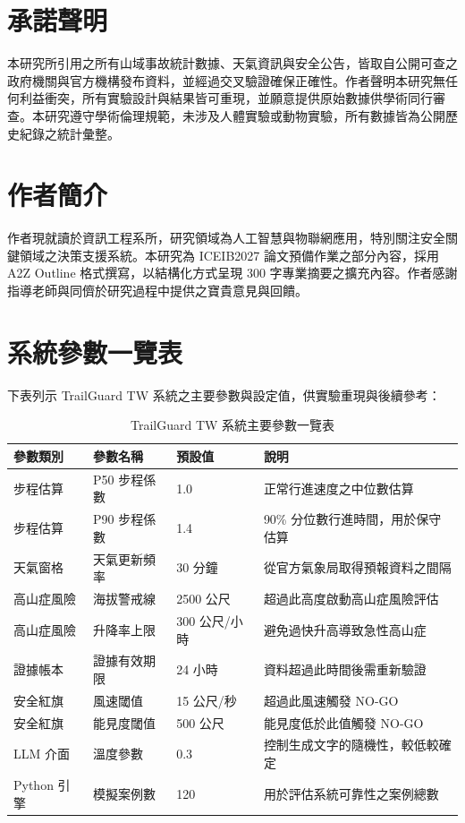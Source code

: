 \documentclass[12pt,a4paper]{article}
\begin{document}
\section{承諾聲明}
本研究所引用之所有山域事故統計數據、天氣資訊與安全公告，皆取自公開可查之政府機關與官方機構發布資料，並經過交叉驗證確保正確性。作者聲明本研究無任何利益衝突，所有實驗設計與結果皆可重現，並願意提供原始數據供學術同行審查。本研究遵守學術倫理規範，未涉及人體實驗或動物實驗，所有數據皆為公開歷史紀錄之統計彙整。

\section{作者簡介}
作者現就讀於資訊工程系所，研究領域為人工智慧與物聯網應用，特別關注安全關鍵領域之決策支援系統。本研究為 ICEIB2027 論文預備作業之部分內容，採用 A2Z Outline 格式撰寫，以結構化方式呈現 300 字專業摘要之擴充內容。作者感謝指導老師與同儕於研究過程中提供之寶貴意見與回饋。

\section{系統參數一覽表}
下表列示 TrailGuard TW 系統之主要參數與設定值，供實驗重現與後續參考：

\begin{table}[htbp]
\centering
\caption{TrailGuard TW 系統主要參數一覽表}
\label{tab:system-params}
\begin{tabular}{l|l|l|p{5cm}}
\toprule
參數類別 & 參數名稱 & 預設值 & 說明 \\
\midrule
步程估算 & P50 步程係數 & 1.0 & 正常行進速度之中位數估算 \\
步程估算 & P90 步程係數 & 1.4 & 90\% 分位數行進時間，用於保守估算 \\
天氣窗格 & 天氣更新頻率 & 30 分鐘 & 從官方氣象局取得預報資料之間隔 \\
高山症風險 & 海拔警戒線 & 2500 公尺 & 超過此高度啟動高山症風險評估 \\
高山症風險 & 升降率上限 & 300 公尺/小時 & 避免過快升高導致急性高山症 \\
證據帳本 & 證據有效期限 & 24 小時 & 資料超過此時間後需重新驗證 \\
安全紅旗 & 風速閾值 & 15 公尺/秒 & 超過此風速觸發 NO-GO \\
安全紅旗 & 能見度閾值 & 500 公尺 & 能見度低於此值觸發 NO-GO \\
LLM 介面 & 溫度參數 & 0.3 & 控制生成文字的隨機性，較低較確定 \\
Python 引擎 & 模擬案例數 & 120 & 用於評估系統可靠性之案例總數 \\
\bottomrule
\end{tabular}
\end{table}
\end{document}
